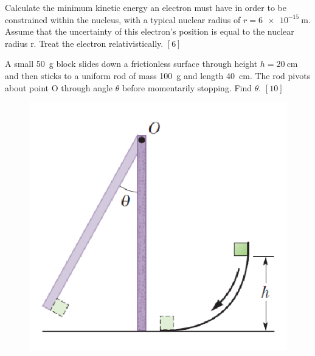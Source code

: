 \begin{problem}
    Calculate the minimum kinetic energy an electron must have in order to be constrained within the nucleus, with a typical nuclear radius of $r = \qty{6e-15}{\m}$. Assume that the uncertainty of this electron’s position is equal to the nuclear radius r. Treat the electron relativistically. \hfill $[6]$
\end{problem}
\newpage
\begin{problem}
    A small \qty{50}{g} block slides down a frictionless surface through height $h = \qty{20}{\cm}$ and then sticks to a uniform rod of mass \qty{100}{g} and length \qty{40}{cm}. The rod pivots about point O through angle $\theta$ before momentarily stopping. Find $\theta$. \hfill $[10]$
    \begin{figure}[H]
        \centering
        \includegraphics{spho_book_TYS_images/2021SPhO_7.png}
    \end{figure}
\end{problem}

